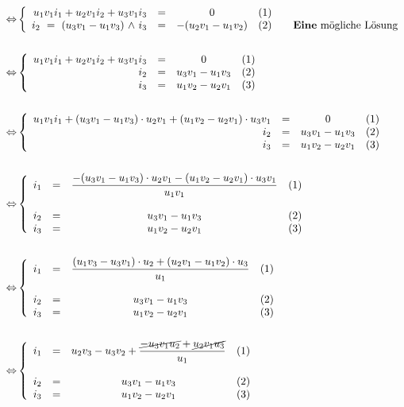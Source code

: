 \begin{Beweis}
\begin{align*}
            \Leftrightarrow &\left\{\begin{array}{rccl} u_1v_1i_1 + u_2v_1i_2 + u_3v_1i_3 & = & 0 & (1) \\ i_2 \text{ } = \text{ } (u_3v_1 - u_1v_3) \text{ $\land$ } i_3 & = & -(u_2v_1 - u_1v_2) & (2) \qquad \text{\textbf{Eine} mögliche Lösung}\end{array}\right.\\\\
            \Leftrightarrow &\left\{\begin{array}{rccl} u_1v_1i_1 + u_2v_1i_2 + u_3v_1i_3 & = & 0 & (1) \\ i_2 & = & u_3v_1 - u_1v_3 & (2) \\ i_3 & = & u_1v_2 - u_2v_1 & (3) \end{array}\right. \\\\
            \Leftrightarrow &\left\{\begin{array}{rccl} u_1v_1i_1 + (u_3v_1 - u_1v_3) \cdot u_2v_1 + (u_1v_2 - u_2v_1) \cdot u_3v_1 & = & 0 & (1) \\ i_2 & = & u_3v_1 - u_1v_3 & (2) \\ i_3 & = & u_1v_2 - u_2v_1 & (3) \end{array}\right. \\\\
            \Leftrightarrow &\left\{\begin{array}{rccl} i_1 & = & \dfrac{-(u_3v_1 - u_1v_3) \cdot u_2v_1 - (u_1v_2 - u_2v_1) \cdot u_3v_1}{u_1v_1} & (1) \\\\ i_2 & = & u_3v_1 - u_1v_3 & (2) \\ i_3 & = & u_1v_2 - u_2v_1 & (3) \end{array}\right. \\\\
            \Leftrightarrow &\left\{\begin{array}{rccl} i_1 & = & \dfrac{(u_1v_3 - u_3v_1) \cdot u_2 + (u_2v_1 - u_1v_2) \cdot u_3}{u_1} & (1) \\\\ i_2 & = & u_3v_1 - u_1v_3 & (2) \\ i_3 & = & u_1v_2 - u_2v_1 & (3) \end{array}\right. \\\\
            \Leftrightarrow &\left\{\begin{array}{rccl} i_1 & = & u_2v_3 - u_3v_2 + \dfrac{ \cancel{-u_3v_1u_2} + \cancel{u_2v_1u_3}}{u_1} & (1) \\\\ i_2 & = & u_3v_1 - u_1v_3 & (2) \\ i_3 & = & u_1v_2 - u_2v_1 & (3) \end{array}\right. \\\\

\end{align*}
\end{Beweis}
